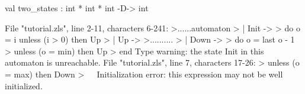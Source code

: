 \chklistingfalse
{}
\begin{ChkListingMsg}
val two_states : int * int * int -D-> int
\end{ChkListingMsg}
\begin{ChkListingErr}
File "tutorial.zls", line 2-11, characters 6-241:
>......automaton
>      | Init ->
>          do o = i unless (i > 0) then Up
>      | Up ->
>..........
>      | Down ->
>          do o = last o - 1
>          unless (o = min) then Up
>      end
Type warning: the state Init in this automaton is unreachable.
File "tutorial.zls", line 7, characters 17-26:
>          unless (o = max) then Down
>                 ^^^^^^^^^
Initialization error: this expression may not be well initialized.
\end{ChkListingErr}

